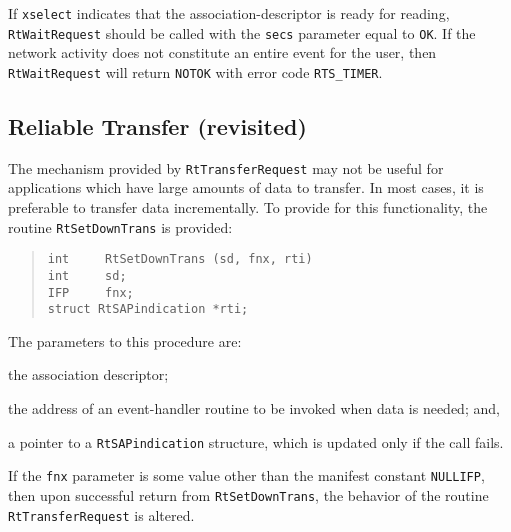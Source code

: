 If \verb"xselect" indicates that the association-descriptor is ready for
reading,
\verb"RtWaitRequest" should be called with the \verb"secs" parameter equal to
\verb"OK".
If the network activity does not constitute an entire event for the user,
then \verb"RtWaitRequest" will return \verb"NOTOK" with error code
\verb"RTS_TIMER".

\subsection     {Reliable Transfer (revisited)}\label{rts:revisited}
The mechanism provided by \verb"RtTransferRequest" may not be useful for
applications which have large amounts of data to transfer.
In most cases,
it is preferable to transfer data incrementally.
To provide for this functionality,
the routine \verb"RtSetDownTrans" is provided:
\begin{quote}\small\begin{verbatim}
int     RtSetDownTrans (sd, fnx, rti)
int     sd;
IFP     fnx;
struct RtSAPindication *rti;
\end{verbatim}\end{quote}
The parameters to this procedure are:
\begin{describe}
\item[\verb"sd":] the association descriptor;

\item[\verb"fnx":] the address of an event-handler routine to be invoked when
data is needed; and,

\item[\verb"rti":] a pointer to a \verb"RtSAPindication" structure, which is
updated only if the call fails.
\end{describe}
If the \verb"fnx" parameter is some value other than the manifest constant
\verb"NULLIFP",
then upon successful return from \verb"RtSetDownTrans",
the behavior of the routine \verb"RtTransferRequest" is altered.
